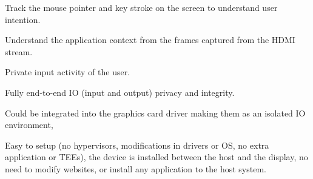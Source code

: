 \begin{mybullet}
  \item Track the mouse pointer and key stroke on the screen to understand user intention.
  \item Understand the application context from the frames captured from the HDMI stream.
  \item Private input activity of the user.
  \item Fully end-to-end IO (input and output) privacy and integrity.
  \item Could be integrated into the graphics card driver making them as an isolated IO environment,
  \item Easy to setup (no hypervisors, modifications in drivers or OS, no extra application or TEEs), the device is installed between the host and the display, no need to modify websites, or install any application to the host system.
\end{mybullet}

\fi